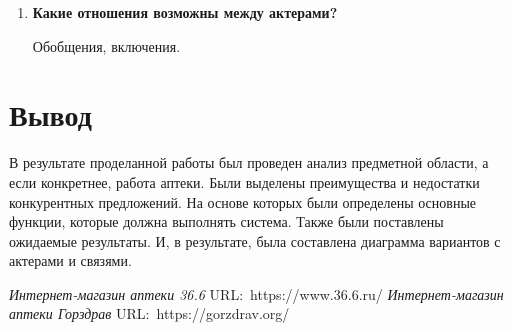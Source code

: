 \begin{enumerate}
{		об их особенностях.}\par
		Действующие лица могут быть первичными или вторичными.
		\textbf{Первичный~актер} --- это актер, который использует систему для
		достижения цели. Примеры использования документируют взаимодействия
		между системой и актерами для достижения целей первичного актера.
		\textbf{Вторичные~актеры} --- это актеры, которым система должна
		оказывать помощь для достижения целей основного субъекта.
		Первичные актеры инициируют взаимодействие с системой.
		Система обычно обращается за помощью к вторичным актерам.
	\item \textbf{Какие отношения возможны между актерами?}\par
		Обобщения, включения.
\end{enumerate}

\newpage

\section*{Вывод}
В результате проделанной работы был проведен анализ предметной области,
а если конкретнее, работа аптеки.
Были выделены преимущества и недостатки конкурентных предложений.
На основе которых были определены основные функции, которые должна выполнять
система. Также были поставлены ожидаемые результаты.
И, в результате, была составлена диаграмма вариантов с актерами и связями.

\newpage

\begin{thebibliography}{0}
	 \textit{Интернет-магазин аптеки 36.6}
		URL:~https://www.36.6.ru/
	 \textit{Интернет-магазин аптеки Горздрав}
		URL:~https://gorzdrav.org/
\end{thebibliography}

